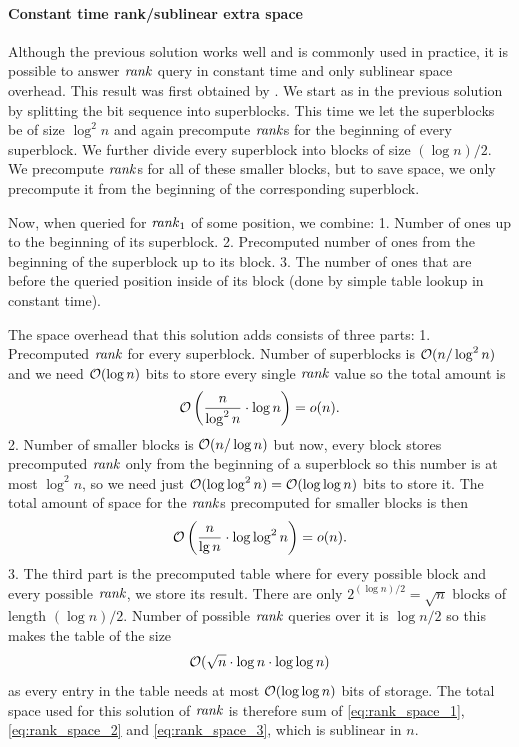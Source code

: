 \paragraph{Constant time rank/sublinear extra space}

Although the previous solution works well and is commonly used in practice, it is possible to
answer $\mathit{rank}$ query in constant time and only sublinear space overhead. This result was first
obtained by \cite{okanohara2007practical}. We start as in the previous solution by splitting
the bit sequence into superblocks. This time we let the superblocks be of size $\log^2 n$
and again precompute $\mathit{rank}$s for the beginning of every superblock. We further divide every
superblock into blocks of size $(\log n)/2$. We precompute $\mathit{rank}$s for all of these
smaller blocks, but to save space, we only precompute it from the beginning of the corresponding
superblock.

Now, when queried for $\mathit{rank}_1$ of some position, we combine:
1. Number of ones up to the beginning of its superblock.
2. Precomputed number of ones from the beginning of the superblock up to its block.
3. The number of ones that are before the queried position inside of its block (done by simple
table lookup in constant time).

The space overhead that this solution adds consists of three parts:
1. Precomputed $\mathit{rank}$ for every superblock. Number of superblocks is $\mathcal{O}(n/\log^2 n)$
and we need $\mathcal{O}(\log n)$ bits to store every single $\mathit{rank}$ value so the total amount is
\begin{equation}
    \mathcal{O}\left(\frac{n}{\log^2 n}\cdot \log n\right) = o(n).
    \label{eq:rank_space_1}
\end{equation}
2. Number of smaller blocks is $\mathcal{O}(n/\log n)$ but now, every block stores precomputed $\mathit{rank}$ only from the
beginning of a superblock so this number is at most $\log^2 n$, so we need just $\mathcal{O}(\log\log^2 n)=\mathcal{O}(\log\log n)$
bits to store it. The total amount of space for the $\mathit{rank}$s precomputed for smaller blocks is then
\begin{equation}
    \mathcal{O}\left(\frac{n}{\lg n}\cdot \log\log^2 n\right)=o(n).
    \label{eq:rank_space_2}
\end{equation}
3. The third part is the precomputed table where for every possible block and every
possible $\mathit{rank}$, we store its result. There are only $2^{(\log n)/2} = \sqrt{n}$ blocks of length 
$(\log n)/2$. Number of possible $\mathit{rank}$ queries over it is $\log n/2$ so this makes the table of the size
\begin{equation}
    \mathcal{O}(\sqrt{n}\cdot \log n\cdot \log\log n)
    \label{eq:rank_space_3}
\end{equation}
as every entry in the table needs at most $\mathcal{O}(\log\log n)$ bits of storage. The total space used for
this solution of $\mathit{rank}$ is therefore sum of \ref{eq:rank_space_1}, \ref{eq:rank_space_2} and
\ref{eq:rank_space_3}, which is sublinear in $n$.

